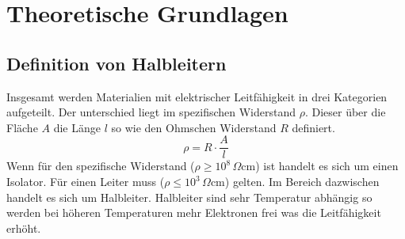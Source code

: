 \section{Theoretische Grundlagen}
\subsection{Definition von Halbleitern}
Insgesamt werden Materialien mit elektrischer Leitfähigkeit in drei Kategorien aufgeteilt. Der unterschied liegt im spezifischen Widerstand $\rho$.
Dieser über die Fläche $A$ die Länge $l$ so wie den Ohmschen Widerstand $R$ definiert.
\begin{equation}
	\rho=R\cdot\frac{A}{l}
	\label{SpezifischesR}
\end{equation}
Wenn für den spezifische Widerstand ($\rho\geq10^8\,\Omega$cm) ist handelt es sich um einen Isolator. Für einen Leiter muss ($\rho\leq10^3\,\Omega$cm) gelten. Im Bereich dazwischen handelt es sich um Halbleiter. Halbleiter sind sehr Temperatur abhängig so werden bei höheren Temperaturen mehr Elektronen frei was die Leitfähigkeit erhöht. 
